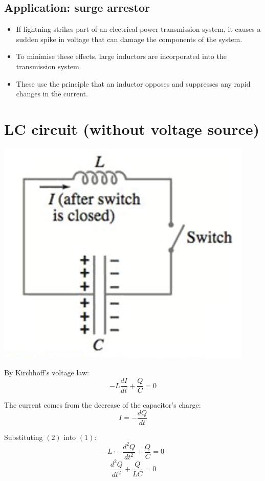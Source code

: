 \documentclass[11pt]{article}
\begin{document}
\subsection{Application: surge arrestor}
\label{sec:org00ac006}
\begin{itemize}
\item If lightning strikes part of an electrical power transmission system, it causes a sudden spike in voltage that can damage the components of the system.
\item To minimise these effects, large inductors are incorporated into the transmission system.
\item These use the principle that an inductor opposes and suppresses any rapid changes in the current.
\end{itemize}


\section{LC circuit (without voltage source)}
\label{sec:org5011e10}

\begin{center}
\includegraphics[scale=0.8]{./images/lc-circuit.png}
\end{center}

By Kirchhoff's voltage law:
\[-L \frac{dI}{dt} + \frac{Q}{C} = 0 \tag{1}\]

The current comes from the decrease of the capacitor's charge:
\[I = - \frac{dQ}{dt} \tag{2}\]

Substituting \((2)\) into \((1)\):
\[- L \cdot -\frac{d^2Q}{dt^2} + \frac{Q}{C} = 0\]
\[\frac{d^2Q}{dt^2} + \frac{Q}{LC} = 0 \tag{3}\]
\end{document}
